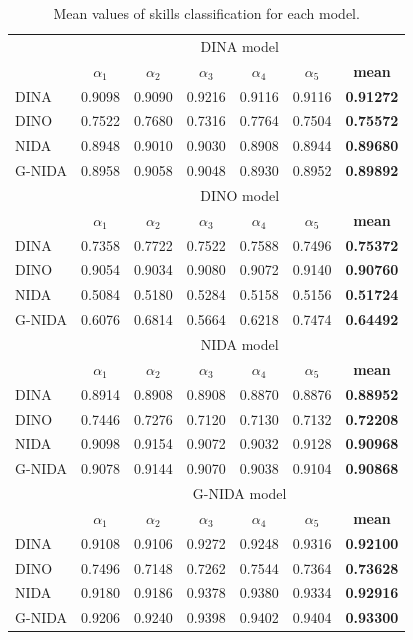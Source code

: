 \documentclass[english]{pwr_wmat_praca_dyplomowa}
\theoremstyle{plain}
\numberwithin{theorem}{chapter}
\theoremstyle{definition}
\numberwithin{theorem}{chapter}
\begin{document}
	\begin{table}[H]
		\centering
		\begin{tabular}{l c c c c c c} 
			\hline
			{\rule{0pt}{3ex}} & \multicolumn{6}{c}{DINA model} \\ 
			& $\alpha_1$ & $\alpha_2$ & $\alpha_3$ & $\alpha_4$ & $\alpha_5$ & \textbf{mean} \\ [0.5ex]
			\hline 
			{\rule{0pt}{3ex}}DINA & 0.9098 & 0.9090 & 0.9216 & 0.9116 & 0.9116 & \textbf{0.91272} \\ 
			DINO & 0.7522 & 0.7680 & 0.7316 & 0.7764 & 0.7504 & \textbf{0.75572} \\
			NIDA & 0.8948 & 0.9010 & 0.9030 & 0.8908 & 0.8944 & \textbf{0.89680} \\
			G-NIDA & 0.8958 & 0.9058 & 0.9048 & 0.8930 & 0.8952 & \textbf{ 0.89892} \\ [0.5ex] 
			\hline
			{\rule{0pt}{3ex}} & \multicolumn{6}{c}{DINO model} \\ 
			& $\alpha_1$ & $\alpha_2$ & $\alpha_3$ & $\alpha_4$ & $\alpha_5$ & \textbf{mean} \\ [0.5ex]
			\hline 
			{\rule{0pt}{3ex}}DINA & 0.7358 & 0.7722 & 0.7522 & 0.7588 & 0.7496 & \textbf{0.75372} \\ 
			DINO & 0.9054 & 0.9034 & 0.9080 & 0.9072 & 0.9140 & \textbf{0.90760} \\
			NIDA & 0.5084 & 0.5180 & 0.5284 & 0.5158 & 0.5156 & \textbf{0.51724} \\
			G-NIDA & 0.6076 & 0.6814 & 0.5664 & 0.6218 & 0.7474 & \textbf{ 0.64492} \\ [0.5ex] 
			\hline
			{\rule{0pt}{3ex}} & \multicolumn{6}{c}{NIDA model} \\ 
			& $\alpha_1$ & $\alpha_2$ & $\alpha_3$ & $\alpha_4$ & $\alpha_5$ & \textbf{mean} \\ [0.5ex]
			\hline 
			{\rule{0pt}{3ex}}DINA & 0.8914 & 0.8908 & 0.8908 & 0.8870 & 0.8876 & \textbf{0.88952} \\ 
			DINO & 0.7446 & 0.7276 & 0.7120 & 0.7130 & 0.7132 & \textbf{0.72208} \\
			NIDA & 0.9098 & 0.9154 & 0.9072 & 0.9032 & 0.9128 & \textbf{0.90968} \\
			G-NIDA & 0.9078 & 0.9144 & 0.9070 & 0.9038 & 0.9104 & \textbf{ 0.90868} \\ [0.5ex] 
			\hline
			{\rule{0pt}{3ex}} & \multicolumn{6}{c}{G-NIDA model} \\ 
			& $\alpha_1$ & $\alpha_2$ & $\alpha_3$ & $\alpha_4$ & $\alpha_5$ & \textbf{mean} \\ [0.5ex]
			\hline 
			{\rule{0pt}{3ex}}DINA & 0.9108 & 0.9106 & 0.9272 & 0.9248 & 0.9316 & \textbf{0.92100} \\ 
			DINO & 0.7496 & 0.7148 & 0.7262 & 0.7544 & 0.7364 & \textbf{0.73628} \\
			NIDA & 0.9180 & 0.9186 & 0.9378 & 0.9380 & 0.9334 & \textbf{0.92916} \\
			G-NIDA & 0.9206 & 0.9240 & 0.9398 & 0.9402 & 0.9404 & \textbf{ 0.93300} \\ [0.5ex] 
			\hline
		\end{tabular}
		\caption{Mean values of skills classification for each model.}
		\label{tab:estimation_skills} 
	\end{table}
	
\end{document}
